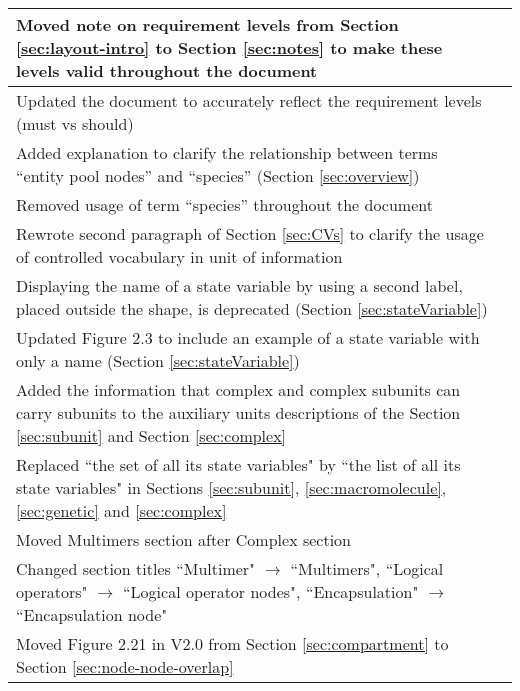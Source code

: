 \begin{center}
\label{tab:revision history 2.1}
\tablelasttail{\hline}
\begin{supertabular}{|p{12cm}|c|}\hline
Moved note on requirement levels from Section \ref{sec:layout-intro} to Section \ref{sec:notes} to make these levels valid throughout the document
& \\\hline Updated the document to accurately reflect the requirement levels (must vs should)
& \\\hline Added explanation to clarify the relationship between terms ``entity pool nodes'' and ``species'' (Section \ref{sec:overview})
& \\\hline Removed usage of term ``species'' throughout the document 
& \\\hline Rewrote second paragraph of Section \ref{sec:CVs} to clarify the usage of controlled vocabulary in unit of information 
& \\\hline Displaying the name of a state variable by using a second label, placed outside the shape, is deprecated (Section \ref{sec:stateVariable}) 
& \\\hline Updated Figure 2.3 to include an example of a state variable with only a name (Section \ref{sec:stateVariable}) 
& \\\hline Added the information that complex and complex subunits can carry subunits to the auxiliary units descriptions of the Section \ref{sec:subunit} and  Section \ref{sec:complex} 
& \\\hline Replaced ``the set of all its state variables" by ``the list of all its state variables" in Sections \ref{sec:subunit}, \ref{sec:macromolecule}, \ref{sec:genetic} and \ref{sec:complex} 
& \\\hline Moved Multimers section after Complex section
& \\\hline Changed section titles ``Multimer" $\rightarrow$ ``Multimers", ``Logical operators" $\rightarrow$ ``Logical operator nodes", ``Encapsulation" $\rightarrow$ ``Encapsulation node" 
& \\\hline Moved Figure 2.21 in V2.0 from Section \ref{sec:compartment} to Section \ref{sec:node-node-overlap}

\end{supertabular}
\end{center}
